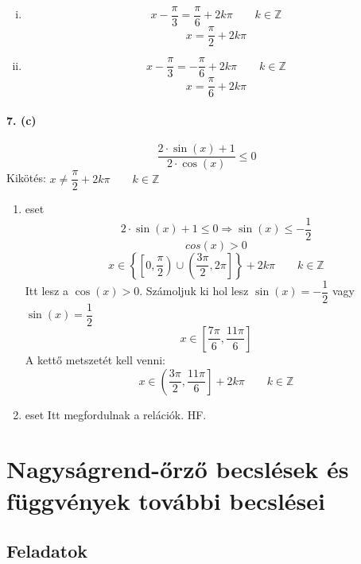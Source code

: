 \documentclass[12pt,a4paper,fleqn]{article}
\newcommand{\myparagraph}[1]{\paragraph{#1}\mbox{}}
\begin{document}

\clearpage

\begin{enumerate}[i.]
  \item
  \[ x - \dfrac{\pi}{3} = \dfrac{\pi}{6} + 2k\pi \qquad k \in \mathbb{Z} \]
  \[ x = \dfrac{\pi}{2} + 2k\pi \]
  \item
  \[ x - \dfrac{\pi}{3} = -\dfrac{\pi}{6} + 2k\pi \qquad k \in \mathbb{Z} \]
  \[ x = \dfrac{\pi}{6} + 2k\pi \]
\end{enumerate}

\myparagraph{7. (c)}
\[ \dfrac{2 \cdot \sin(x) + 1}{2 \cdot \cos(x)} \leq 0 \]
Kikötés: $ x \neq \dfrac{\pi}{2} + 2k\pi \qquad k \in \mathbb{Z} $
\begin{enumerate}
  \item eset
  \[ 2 \cdot \sin(x) + 1 \leq 0 \Rightarrow \sin(x) \leq -\dfrac{1}{2}\]
  \[ cos(x) > 0 \]
  \[ x \in \left\{ \left[0, \dfrac{\pi}{2}\right)
    \cup \left(\dfrac{3\pi}{2}, 2\pi\right] \right\} + 2k\pi \qquad k \in \mathbb{Z} \]
  Itt lesz a $\cos(x) > 0$.
  Számoljuk ki hol lesz $\sin(x) = -\dfrac{1}{2}$ vagy $\sin(x) = \dfrac{1}{2}$
  \[ x \in \left[\dfrac{7\pi}{6}, \dfrac{11\pi}{6}\right] \]
  A kettő metszetét kell venni:
  \[ x \in \left(\dfrac{3\pi}{2}, \dfrac{11\pi}{6}\right] + 2k\pi \qquad k \in \mathbb{Z} \]
  \item eset
  Itt megfordulnak a relációk. HF.
\end{enumerate}


\clearpage
\section{Nagyságrend-őrző becslések és\\ függvények további becslései}
\setcounter{subsection}{1}
\subsection{Feladatok}
\end{document}
